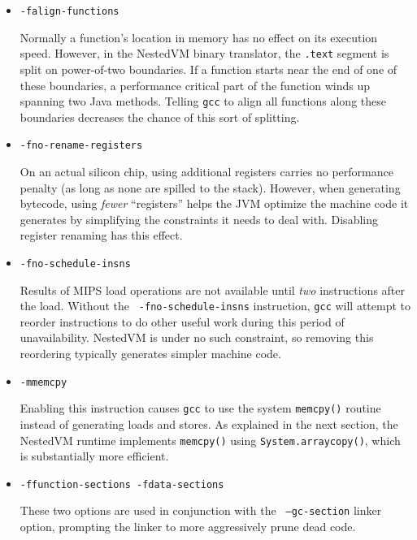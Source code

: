 \documentclass{acmconf}
\begin{document}
\begin{itemize}

\item {\tt -falign-functions}

      Normally a function's location in memory has no effect on its
      execution speed.  However, in the NestedVM binary translator,
      the {\tt .text} segment is split on power-of-two boundaries.  If
      a function starts near the end of one of these boundaries, a
      performance critical part of the function winds up spanning two
      Java methods.  Telling {\tt gcc} to align all functions along
      these boundaries decreases the chance of this sort of splitting.

\item {\tt -fno-rename-registers}

      On an actual silicon chip, using additional registers carries no
      performance penalty (as long as none are spilled to the stack).
      However, when generating bytecode, using {\it fewer}
      ``registers'' helps the JVM optimize the machine code it
      generates by simplifying the constraints it needs to deal with.
      Disabling register renaming has this effect.

\item {\tt -fno-schedule-insns}

      Results of MIPS load operations are not available until {\it
      two} instructions after the load.  Without the {\tt
      -fno-schedule-insns} instruction, {\tt gcc} will attempt to
      reorder instructions to do other useful work during this period
      of unavailability.  NestedVM is under no such constraint, so
      removing this reordering typically generates simpler machine
      code.

\item {\tt -mmemcpy}

      Enabling this instruction causes {\tt gcc} to use the system
      {\tt memcpy()} routine instead of generating loads and stores.
      As explained in the next section, the NestedVM runtime
      implements {\tt memcpy()} using {\tt System.arraycopy()}, which
      is substantially more efficient.

\item {\tt -ffunction-sections -fdata-sections}

      These two options are used in conjunction with the {\tt
      --gc-section} linker option, prompting the linker to more
      aggressively prune dead code.

\end{itemize}
\end{document}
